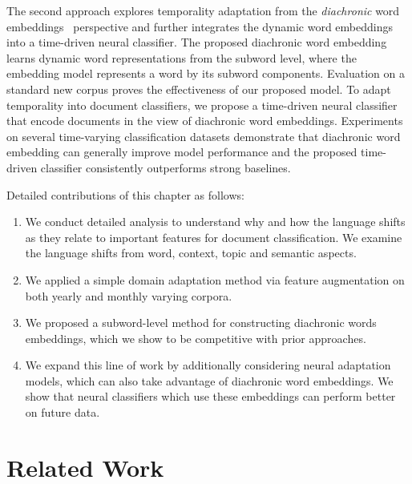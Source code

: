 The second approach explores temporality adaptation from the {\em diachronic} word embeddings~\cite{kutuzov2018diachronic} perspective and further integrates the dynamic word embeddings into a time-driven neural classifier.
The proposed diachronic word embedding learns dynamic word representations from the subword level, where the embedding model represents a word by its subword components. 
Evaluation on a standard new corpus proves the effectiveness of our proposed model. 
To adapt temporality into document classifiers, we propose a time-driven neural classifier that encode documents in the view of diachronic word embeddings.
Experiments on several time-varying classification datasets demonstrate that diachronic word embedding can generally improve model performance and the proposed time-driven classifier consistently outperforms strong baselines. 

Detailed contributions of this chapter as follows:

\begin{enumerate}
    \item We conduct detailed analysis to understand why and how the language shifts as they relate to important features for document classification. We examine the language shifts from word, context, topic and semantic aspects.
    \item We applied a simple domain adaptation method via feature augmentation on both yearly and monthly varying corpora.
    \item We proposed a subword-level method for constructing diachronic words embeddings, which we show to be competitive with prior approaches. 
    \item We expand this line of work by additionally considering neural adaptation models, which can also take advantage of diachronic word embeddings. We show that neural classifiers which use these embeddings can perform better on future data. 
\end{enumerate}


\section{Related Work}
\label{chap3:sec:survey}

